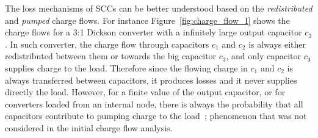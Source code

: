 The loss mechanisms of SCCs can be better understood based on the \emph{redistributed} and \emph{pumped} charge flows. For instance Figure~\ref{fig:charge_flow_I} shows the charge flows for a 3:1 Dickson converter with a infinitely large output capacitor $c_3$. In such converter, the charge flow through capacitors $c_1$ and $c_2$ is always either redistributed between them or towards the big capacitor $c_3$, and only capacitor $c_3$ supplies charge to the load. Therefore since the flowing charge in $c_1$ and $c_2$ is always transferred between capacitors, it produces losses and it never supplies directly the load. However, for a finite value of the output capacitor, or for converters loaded from an internal node, there is always the probability that all capacitors contribute to pumping charge to the load~\cite{2013Breussegem:c_out}; phenomenon that was not considered in the initial charge flow analysis.
